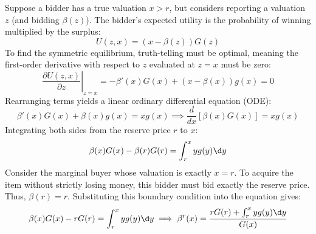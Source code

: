 {\begin{itemize}
    Suppose a bidder has a true valuation $x > r$, but considers reporting a valuation $z$ (and bidding $\beta(z)$). The bidder's expected utility is the probability of winning multiplied by the surplus:
    \[
    U(z, x) = (x - \beta(z))G(z)
    \]
    To find the symmetric equilibrium, truth-telling must be optimal, meaning the first-order derivative with respect to $z$ evaluated at $z=x$ must be zero:
    \[
    \left. \frac{\partial U(z,x)}{\partial z} \right|_{z=x} = -\beta'(x)G(x) + (x - \beta(x))g(x) = 0
    \]
    Rearranging terms yields a linear ordinary differential equation (ODE):
    \[
    \beta'(x)G(x) + \beta(x)g(x) = xg(x) \implies \frac{d}{dx}[\beta(x)G(x)] = xg(x)
    \]
    Integrating both sides from the reserve price $r$ to $x$:
    \[
    \beta(x)G(x) - \beta(r)G(r) = \int_r^x y g(y) \d y
    \]
    Consider the marginal buyer whose valuation is exactly $x=r$. To acquire the item without strictly losing money, this bidder must bid exactly the reserve price. Thus, $\beta(r) = r$. Substituting this boundary condition into the equation gives:
    \[
    \beta(x)G(x) - rG(r) = \int_r^x y g(y) \d y \implies \beta^r(x) = \frac{rG(r) + \int_r^x y g(y) \d y}{G(x)}
    \]
  \end{itemize}
}


